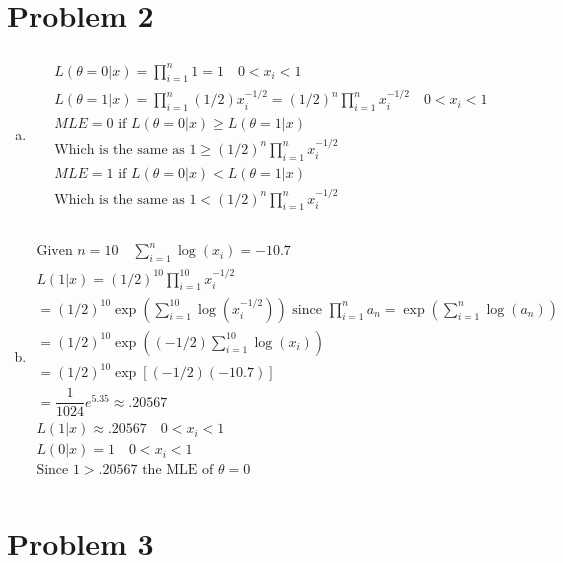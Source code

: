 \documentclass{article}
\newcommand{\sumn}{\sum_{i=1}^{n}}
\newcommand{\prodn}{\prod_{i=1}^{n}}
\begin{document}
\begin{flushleft}
\begin{enumerate}[(a)]
\end{enumerate}

	\section*{Problem 2}
\begin{enumerate}[(a)]
	
	\item 
\begin{multline*}\\
L(\theta=0|x)=\prodn 1=1 \quad 0<x_i<1\\
L(\theta=1|x)=\prodn (1/2)x_i^{-1/2}=(1/2)^n\prodn x_i^{-1/2} \quad 0<x_i<1\\
MLE=0 \text{ if }  L(\theta=0|x)\geq L(\theta=1|x) \\
\text{Which is the same as } 1\geq (1/2)^n\prodn x_i^{-1/2}\\
MLE=1 \text{ if } L(\theta=0|x)< L(\theta=1|x) \\
\text{Which is the same as } 1<(1/2)^n\prodn x_i^{-1/2}\\
\end{multline*}

	\item 
\begin{multline*}\\
\text{Given } n=10 \quad \sumn \log(x_i)=-10.7\\
L(1|x)=(1/2)^{10}\prod_{i=1}^{10} x_i^{-1/2}\\
=(1/2)^{10}\exp\left(\sum_{i=1}^{10}\log(x_i^{-1/2})\right) \text{ since } \prodn a_n=\exp\left(\sumn \log(a_n)\right)\\
=(1/2)^{10}\exp\left((-1/2)\sum_{i=1}^{10}\log(x_i)\right)\\
=(1/2)^{10}\exp[(-1/2)(-10.7)]\\
=\dfrac{1}{1024}e^{5.35}\approx.20567\\
L(1|x)\approx .20567 \quad 0<x_i<1\\
L(0|x)=1 \quad 0<x_i<1\\
\text{Since } 1>.20567 \text{ the MLE of } \theta=0\\
\end{multline*}

\end{enumerate}

	\section*{Problem 3}
	

\end{flushleft}
\end{document}
